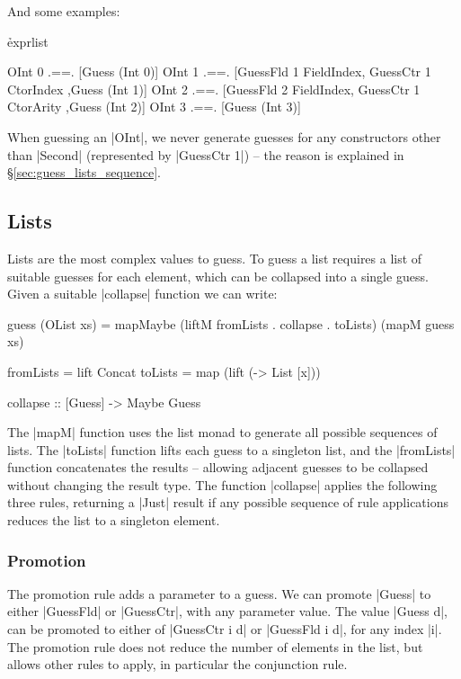 \documentclass{llncs}
\begin{document}
\noindent And some examples:

\h{exprlist}\begin{code}
OInt 0  .==.  [Guess (Int 0)]
OInt 1  .==.  [GuessFld 1 FieldIndex, GuessCtr 1 CtorIndex
              ,Guess (Int 1)]
OInt 2  .==.  [GuessFld 2 FieldIndex, GuessCtr 1 CtorArity
              ,Guess (Int 2)]
OInt 3  .==.  [Guess (Int 3)]
\end{code}

When guessing an |OInt|, we never generate guesses for any constructors other than |Second| (represented by |GuessCtr 1|) -- the reason is explained in \S\ref{sec:guess_lists_sequence}.

\subsection{Lists}
\label{sec:guess_lists}

Lists are the most complex values to guess. To guess a list requires a list of suitable guesses for each element, which can be collapsed into a single guess. Given a suitable |collapse| function we can write:

\begin{code}
guess (OList xs) = mapMaybe
    (liftM fromLists . collapse . toLists) (mapM guess xs)

fromLists  = lift Concat
toLists    = map (lift (\x -> List [x]))

collapse :: [Guess] -> Maybe Guess
\end{code}

The |mapM| function uses the list monad to generate all possible sequences of lists. The |toLists| function lifts each guess to a singleton list, and the |fromLists| function concatenates the results -- allowing adjacent guesses to be collapsed without changing the result type. The function |collapse| applies the following three rules, returning a |Just| result if any possible sequence of rule applications reduces the list to a singleton element.

\subsubsection{Promotion}

The promotion rule adds a parameter to a guess. We can promote |Guess| to either |GuessFld| or |GuessCtr|, with any parameter value. The value |Guess d|, can be promoted to either of |GuessCtr i d| or |GuessFld i d|, for any index |i|. The promotion rule does not reduce the number of elements in the list, but allows other rules to apply, in particular the conjunction rule.
\end{document}
